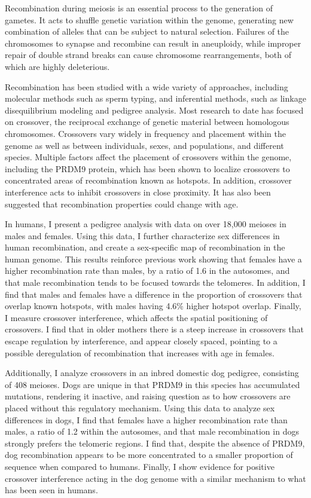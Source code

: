 \documentclass[11pt,twoside,openright,letterpaper]{memoir}
\begin{document}
Recombination during meiosis is an essential process to the generation of gametes.
It acts to shuffle genetic variation within the genome, generating new combination of alleles that can be subject to natural selection.
Failures of the chromosomes to synapse and recombine can result in aneuploidy, while improper repair of double strand breaks can cause chromosome rearrangements, both of which are highly deleterious.

Recombination has been studied with a wide variety of approaches, including molecular methods such as sperm typing, and inferential methods, such as linkage disequilibrium modeling and pedigree analysis.
Most research to date has focused on crossover, the reciprocal exchange of genetic material between homologous chromosomes.
Crossovers vary widely in frequency and placement within the genome as well as between individuals, sexes, and populations, and different species.
Multiple factors affect the placement of crossovers within the genome, including the PRDM9 protein, which has been shown to localize crossovers to concentrated areas of recombination known as hotspots.
In addition, crossover interference acts to inhibit crossovers in close proximity.
It has also been suggested that recombination properties could change with age.

In humans, I present a pedigree analysis with data on over 18,000 meioses in males and females.
Using this data, I further characterize sex differences in human recombination, and create a sex-specific map of recombination in the human genome.
This results reinforce previous work showing that females have a higher recombination rate than males, by a ratio of 1.6 in the autosomes, and that male recombination tends to be focused towards the telomeres.
In addition, I find that males and females have a difference in the proportion of crossovers that overlap known hotspots, with males having 4.6\% higher hotspot overlap.
Finally, I measure crossover interference, which affects the spatial positioning of crossovers.
I find that in older mothers there is a steep increase in crossovers that escape regulation by interference, and appear closely spaced, pointing to a possible deregulation of recombination that increases with age in females.

Additionally, I analyze crossovers in an inbred domestic dog pedigree, consisting of 408 meioses.
Dogs are unique in that PRDM9 in this species has accumulated mutations, rendering it inactive, and raising question as to how crossovers are placed without this regulatory mechanism.
Using this data to analyze sex differences in dogs, I find that females have a higher recombination rate than males, a ratio of 1.2 within the autosomes, and that male recombination in dogs strongly prefers the telomeric regions.
I find that, despite the absence of PRDM9, dog recombination appears to be more concentrated to a smaller proportion of sequence when compared to humans.
Finally, I show evidence for positive crossover interference acting in the dog genome with a similar mechanism to what has been seen in humans.
\end{document}
